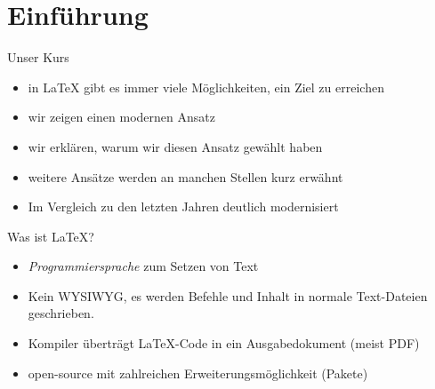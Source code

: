 \section{Einführung}

\begin{frame}{Unser Kurs}
  \begin{itemize}
      \item in \LaTeX{} gibt es immer viele Möglichkeiten, ein Ziel zu erreichen
    \item wir zeigen einen modernen Ansatz 
    \item wir erklären, warum wir diesen Ansatz gewählt haben
    \item weitere Ansätze werden an manchen Stellen kurz erwähnt
  \end{itemize}

  \vspace{10pt}
  \begin{itemize}
    \item Im Vergleich zu den letzten Jahren deutlich modernisiert
  \end{itemize}
\end{frame}

\begin{frame}{Was ist \LaTeX?}
  \begin{itemize}
    \item \emph{Programmiersprache} zum Setzen von Text
    \item Kein WYSIWYG, es werden Befehle und Inhalt in normale Text-Dateien geschrieben.
    \item Kompiler überträgt \LaTeX-Code in ein Ausgabedokument (meist PDF)
    \item open-source mit zahlreichen Erweiterungsmöglichkeit (Pakete)
  \end{itemize}
\end{frame}

